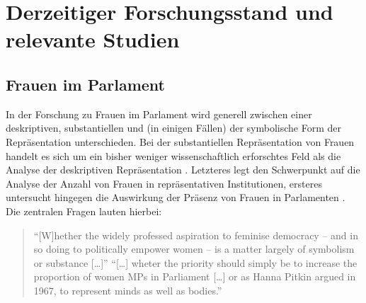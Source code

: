 \documentclass[12pt, 
    twoside=false, 
    bibliography=totoc, 
    numbers=endperiod, 
    headings=normal, 
    toc=chapterentrydotfill
    ]{scrbook}
\begin{document}
\section {Derzeitiger Forschungsstand und relevante Studien }

\subsection{Frauen im Parlament}

In der Forschung zu Frauen im Parlament wird generell zwischen einer deskriptiven, substantiellen und (in einigen Fällen) der symbolische Form der Repräsentation unterschieden. Bei der substantiellen Repräsentation von Frauen handelt es sich um ein bisher weniger wissenschaftlich erforschtes Feld als die Analyse der deskriptiven Repräsentation \parencite[59]{wangnerud_2009}. 
Letzteres legt den Schwerpunkt auf die Analyse der Anzahl von Frauen in repräsentativen Institutionen, ersteres untersucht hingegen die Auswirkung der Präsenz von Frauen in Parlamenten \parencites[14]{coffe_2013}[52]{wangnerud_2009}.
Die zentralen Fragen lauten hierbei:

\begin{quote}
  \enquote{[W]hether the widely professed aspiration to feminise democracy -- and in so doing to politically empower women -- is a matter largely of symbolism or substance […]}
  \enquote{[…] wheter the priority should simply be to increase the proportion of women MPs in Parliament […] or as Hanna Pitkin argued in 1967, to represent minds as well as bodies.}
  \parencite[413]{blaxill_2016}
\end{quote}
\end{document}

